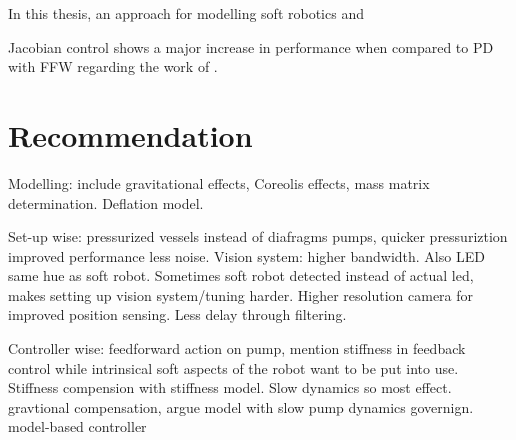 In this thesis, an approach for modelling soft robotics and 


Jacobian control shows a major increase in performance when compared to PD with FFW regarding the work of \cite{berkers}.





\section{Recommendation}


Modelling: include gravitational effects, Coreolis effects, mass matrix determination. Deflation model. 

Set-up wise: pressurized vessels instead of diafragms pumps, quicker pressuriztion improved performance less noise. Vision system: higher bandwidth. Also LED same hue as soft robot. Sometimes soft robot detected instead of actual led, makes setting up vision system/tuning harder. Higher resolution camera for improved position sensing. Less delay through filtering.

Controller wise: feedforward action on pump, mention stiffness in feedback control while intrinsical soft aspects of the robot want to be put into use. Stiffness compension with stiffness model. Slow dynamics so most effect. gravtional compensation, argue model with slow pump dynamics governign. model-based controller